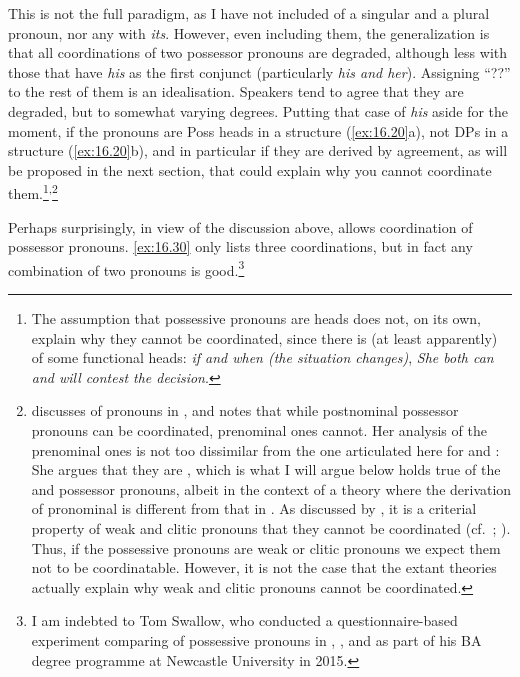 \documentclass[output=paper]{langsci/langscibook}
\begin{document}
This is not the full paradigm, as I have not included  of a
singular and a plural pronoun, nor any  with \emph{its}. However,
even including them, the generalization is that all coordinations of two
possessor pronouns are degraded, although less with those that have \emph{his}
as the first conjunct (particularly \emph{his and her}). Assigning \enquote{??}
to the rest of them is an idealisation. Speakers tend to agree that they are
degraded, but to somewhat varying degrees. Putting that case of \emph{his}
aside for the moment, if the pronouns are Poss heads in a structure
(\ref{ex:16.20}a), not DPs in a structure (\ref{ex:16.20}b), and in
particular if they are derived by agreement, as will be proposed in the next
section, that could explain why you cannot coordinate them.\footnote{The
    assumption that possessive pronouns are heads does not, on its own, explain
    why they cannot be coordinated, since there is (at least apparently)
     of some functional heads: \emph{if and when (the situation
    changes)}, \emph{She both can and will contest the
    decision}.}\textsuperscript{,}\footnote{\citet{Cardinaletti1998} discusses  of pronouns in
        , and notes that while postnominal possessor pronouns can be
        coordinated, prenominal ones cannot. Her analysis of the prenominal
        ones is not too dissimilar from the one articulated here for 
        and : She argues that they are , which is what I will
        argue below holds true of the  and  possessor pronouns,
        albeit in the context of a theory \citep{Roberts2010} where the
        derivation of pronominal  is different from that in
        \citet{Cardinaletti1998}. As discussed by \citet{CarSta1999}, it is a
        criterial property of weak and clitic pronouns that they cannot be
        coordinated (cf.\ \citealt{Kayne1975};
        \citealt[228--233]{Holmberg1986}). Thus, if the  possessive
        pronouns are weak or clitic pronouns we expect them not to be
        coordinatable. However, it is not the case that the extant theories
    actually explain why weak and clitic pronouns cannot be coordinated.}\largerpage[2]

Perhaps surprisingly, in view of the discussion above,  allows
coordination of possessor pronouns. \eqref{ex:16.30} only lists three coordinations, but in
fact any combination of two pronouns is good.\footnote{I am indebted to Tom
    Swallow, who conducted a questionnaire-based experiment comparing
     of possessive pronouns in , , and  as part
of his BA degree programme at Newcastle University in 2015.}
\end{document}
